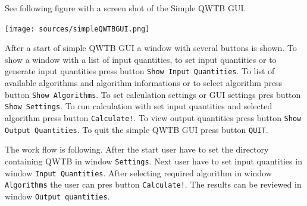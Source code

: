 \documentclass[12pt,a4paper,oneside]{report} %
\begin{document}
See following figure with a screen shot of the Simple QWTB GUI.

\begin{center}
        \texttt{[image: sources/simpleQWTBGUI.png]}
\end{center}

After a start of simple QWTB GUI a window with several buttons is shown. To show
a window with a list of input quantities, to set input quantities or to generate input quantities
press button {\tt Show Input Quantities}. To list of available algorithms and algorithm informations
or to select algorithm press button
{\tt Show Algorithms}. To set calculation settings or GUI settings pres  button {\tt Show Settings}.
To run calculation with set input quantities and selected algorithm press  button {\tt Calculate!}.
To view output quantities press button {\tt Show Output Quantities}. To quit the simple QWTB
GUI press button {\tt QUIT}.

The work flow is following. After the start user have to set the directory containing QWTB in window
{\tt Settings}. Next user have to set input quantities in window {\tt Input Quantities}. After selecting required
algorithm in window {\tt Algorithms} the user can pres button {\tt Calculate!}. The results can be
reviewed in window {\tt Output quantities}.


\printbibliography[title={Bilbiography},heading={bibnumbered}]
\end{document}
